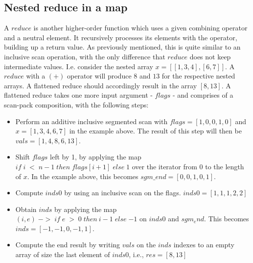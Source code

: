 \subsection{Nested reduce in a map}
\label{chapter:section:flattening:reduce}
A $\mathit{reduce}$ is another higher-order function which uses a given combining operator and a neutral element. It recursively processes its elements with the operator, building up a return value.
As previously mentioned, this is quite similar to an inclusive scan operation, with the only difference that $\mathit{reduce}$ does not keep intermediate values. I.e. consider the nested array $\mathit{x=[[1,3,4],[6,7]]}$. A $\mathit{reduce}$ with a $\mathit{(+)}$ operator will produce $\mathit{8}$ and $\mathit{13}$ for the respective nested arrays. A flattened reduce should accordingly result in the array $\mathit{[8, 13]}$. A flattened reduce takes one more input argument - $\mathit{flags}$ - and comprises of a scan-pack composition, with the following steps:
\begin{itemize}
    \item Perform an additive inclusive segmented scan with $\mathit{flags=[1, 0, 0, 1, 0]}$ and $\mathit{x=[1, 3, 4, 6, 7]}$ in the example above. The result of this step will then be  $\mathit{vals=[1, 4, 8, 6, 13]}$. 
    
    \item Shift $\mathit{flags}$ left by 1, by applying the map $\mathit{if}\;\mathit{i}\;\mathit{<}\;\mathit{n-1}\;\mathit{then}\;\mathit{flags[i+1]}\;\mathit{else}\;\mathit{1}$ over the iterator from $\mathit{0}$ to the length of $\mathit{x}$. In the example above, this becomes $\mathit{sgm\_end=[0,0,1,0,1]}$.
    
    \item Compute $\mathit{inds0}$ by using an inclusive scan on the flags. $\mathit{inds0=[1,1,1,2,2]}$
    
    \item Obtain $\mathit{inds}$ by applying the map\\ $(i,e)\;->\;\mathit{if}\;\mathit{e}\;\mathit{>}\;\mathit{0}\;\mathit{then}\:\mathit{i-1}\;\mathit{else}\;\mathit{-1}$ on $\mathit{inds0}$ and $\mathit{sgm_end}$. This becomes $\mathit{inds=[-1,-1,0,-1,1]}$.
    
    \item Compute the end result by writing $\mathit{vals}$ on the $\mathit{inds}$ indexes to an empty array of size the last element of $\mathit{inds0}$, i.e., $\mathit{res=[8,13]}$
\end{itemize}

